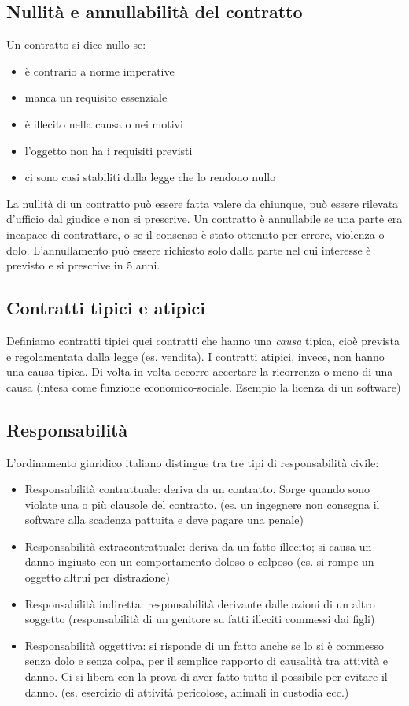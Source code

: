 \subsection{Nullità e annullabilità del contratto}
Un contratto si dice nullo se:
\begin{itemize}
    \item è contrario a norme imperative
    \item manca un requisito essenziale
    \item è illecito nella causa o nei motivi
    \item l'oggetto non ha i requisiti previsti
    \item ci sono casi stabiliti dalla legge che lo rendono nullo
\end{itemize}
La nullità di un contratto può essere fatta valere da chiunque, può essere rilevata d'ufficio dal giudice e non si prescrive.
\newline
Un contratto è annullabile se una parte era incapace di contrattare, o se il consenso è stato ottenuto per errore, violenza o dolo.\newline
L'annullamento può essere richiesto solo dalla parte nel cui interesse è previsto e si prescrive in 5 anni.
\subsection{Contratti tipici e atipici}
Definiamo contratti tipici quei contratti che hanno una \emph{causa} tipica, cioè prevista e regolamentata dalla legge (es. vendita).\newline
I contratti atipici, invece, non hanno una causa tipica. Di volta in volta occorre accertare la ricorrenza o meno di una causa 
(intesa come funzione economico-sociale. Esempio la licenza di un software)

\subsection{Responsabilità}
L'ordinamento giuridico italiano distingue tra tre tipi di responsabilità civile:
\begin{itemize}
    \item Responsabilità contrattuale: deriva da un contratto. Sorge quando sono violate una o più clausole del contratto. 
        (es. un ingegnere non consegna il software alla scadenza pattuita e deve pagare una penale)
    \item Responsabilità extracontrattuale: deriva da un fatto illecito; si causa un danno ingiusto con un comportamento doloso o colposo 
        (es. si rompe un oggetto altrui per distrazione)
    \item Responsabilità indiretta: responsabilità derivante dalle azioni di un altro soggetto 
        (responsabilità di un genitore su fatti illeciti commessi dai figli)
    \item Responsabilità oggettiva: si risponde di un fatto anche se lo si è commesso senza dolo e senza colpa, per il semplice
        rapporto di causalità tra attività e danno. Ci si libera con la prova di aver fatto tutto il possibile per evitare il danno. 
        (es. esercizio di attività pericolose, animali in custodia ecc.)
\end{itemize}

